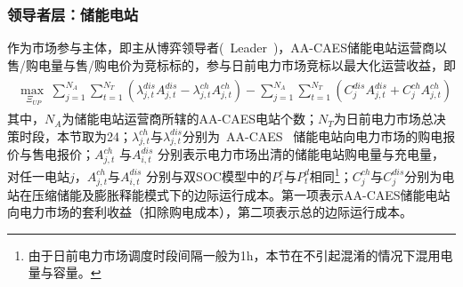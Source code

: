 \subsubsection{领导者层：储能电站}
作为市场参与主体，即主从博弈领导者(~Leader~)，AA-CAES储能电站运营商以售/购电量与售/购电价为竞标标的，参与日前电力市场竞标以最大化运营收益，即
\begin{eqnarray}
\label{equ:aa-caes-pab-leader-obj}
\begin{array}{l}
\mathop {\max \;}\limits_{{\Xi _{UP}}} \sum\limits_{j = 1}^{{N_A}} {\sum\limits_{t = 1}^{{N_T}} {({\lambda _{j,t}^{dis}A_{j,t}^{dis} - \lambda _{j,t}^{ch}A_{j,t}^{ch}})} } - \sum\limits_{j = 1}^{{N_A}} {\sum\limits_{t = 1}^{{N_T}} {({C_j^{dis}A_{j,t}^{dis} + C_j^{ch}A_{j,t}^{ch}})} }
\end{array}
\end{eqnarray}
其中，$N_A$为储能电站运营商所辖的AA-CAES电站个数；$N_T$为日前电力市场总决策时段，本节取为24；$\lambda _{j,t}^{ch}$与$\lambda _{j,t}^{dis}$分别为~AA-CAES~ 储能电站向电力市场的购电报价与售电报价；$A_{j,t}^{ch}$ 与$A_{i,t}^{dis}$ 分别表示电力市场出清的储能电站购电量与充电量，对任一电站$j$，$A_{j,t}^{ch}$与$A_{i,t}^{dis}$ 分别与双SOC模型中的$P_t^c$与$P_t^d$相同\footnote{由于日前电力市场调度时段间隔一般为1h，本节在不引起混淆的情况下混用电量与容量。}；$C_j^{ch}$与$C_j^{dis}$分别为电站在压缩储能及膨胀释能模式下的边际运行成本。第一项表示AA-CAES储能电站向电力市场的套利收益（扣除购电成本），第二项表示总的边际运行成本。

